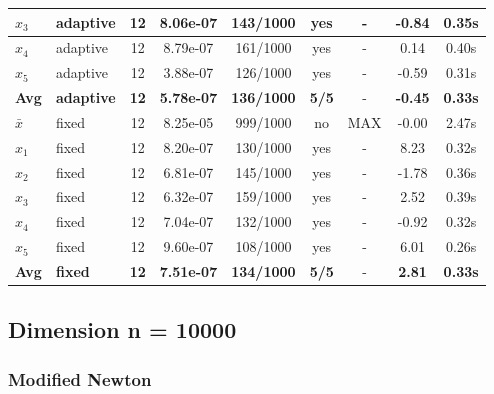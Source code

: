 \begin{longtable}{|l|l|c|c|c|c|c|c|c|}
\hline
$x_3$ & adaptive & 12 & 8.06e-07 & 143/1000 & yes & - & -0.84 & 0.35s \\
\hline
$x_4$ & adaptive & 12 & 8.79e-07 & 161/1000 & yes & - & 0.14 & 0.40s \\
\hline
$x_5$ & adaptive & 12 & 3.88e-07 & 126/1000 & yes & - & -0.59 & 0.31s \\
\hline
\hline\hline
\textbf{Avg} & \textbf{adaptive} & \textbf{12} & \textbf{5.78e-07} & \textbf{136/1000} & \textbf{5/5} & - & \textbf{-0.45} & \textbf{0.33s} \\
\hline\hline
\hline
$\bar{x}$ & fixed & 12 & 8.25e-05 & 999/1000 & no & MAX & -0.00 & 2.47s \\
\hline
$x_1$ & fixed & 12 & 8.20e-07 & 130/1000 & yes & - & 8.23 & 0.32s \\
\hline
$x_2$ & fixed & 12 & 6.81e-07 & 145/1000 & yes & - & -1.78 & 0.36s \\
\hline
$x_3$ & fixed & 12 & 6.32e-07 & 159/1000 & yes & - & 2.52 & 0.39s \\
\hline
$x_4$ & fixed & 12 & 7.04e-07 & 132/1000 & yes & - & -0.92 & 0.32s \\
\hline
$x_5$ & fixed & 12 & 9.60e-07 & 108/1000 & yes & - & 6.01 & 0.26s \\
\hline
\hline\hline
\textbf{Avg} & \textbf{fixed} & \textbf{12} & \textbf{7.51e-07} & \textbf{134/1000} & \textbf{5/5} & - & \textbf{2.81} & \textbf{0.33s} \\
\hline\hline
\end{longtable}


\subsection{Dimension n = 10000}

\subsubsection{Modified Newton}

